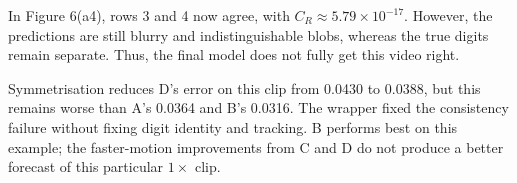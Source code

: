 In Figure 6(a4), rows 3 and 4 now agree, with $C_R\approx5.79\times10^{-17}$. However, the predictions are still blurry and indistinguishable blobs, whereas the true digits remain separate. Thus, the final model does not fully get this video right.

Symmetrisation reduces D's error on this clip from 0.0430 to 0.0388, but this remains worse than A's 0.0364 and B's 0.0316. The wrapper fixed the consistency failure without fixing digit identity and tracking. B performs best on this example; the faster-motion improvements from C and D do not produce a better forecast of this particular $1\times$ clip.
